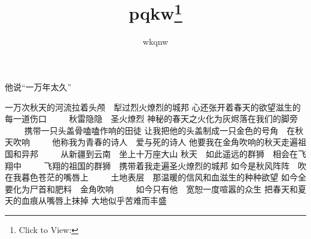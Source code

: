\documentclass{article}
\title{pqkw\footnote{Click to View:\url{}}}
\author{wkqnw}
\date{}
\begin{document}

\Large

他说“一万年太久”

一万次秋天的河流拉着头颅　犁过烈火燎烈的城邦
心还张开着春天的欲望滋生的每一道伤口
　　
秋雷隐隐　圣火燎烈
神秘的春天之火化为灰烬落在我们的脚旁
　　
携带一只头盖骨嗑嗑作响的田徒
让我把他的头盖制成一只金色的号角　在秋天吹响
　　
他称我为青春的诗人　爱与死的诗人
他要我在金角吹响的秋天走遍祖国和异邦
　　
从新疆到云南　坐上十万座大山
秋天　如此遥远的群狮　相会在飞翔中
　　
飞翔的祖国的群狮　携带着我走遍圣火燎烈的城邦
如今是秋风阵阵　吹在我暮色苍茫的嘴唇上
　　
土地表层　那温暖的信风和血滋生的种种欲望
如今全要化为尸首和肥料　金角吹响
　　
如今只有他　宽恕一度喧嚣的众生
把春天和夏天的血痕从嘴唇上抹掉
大地似乎苦难而丰盛
\end{document}
